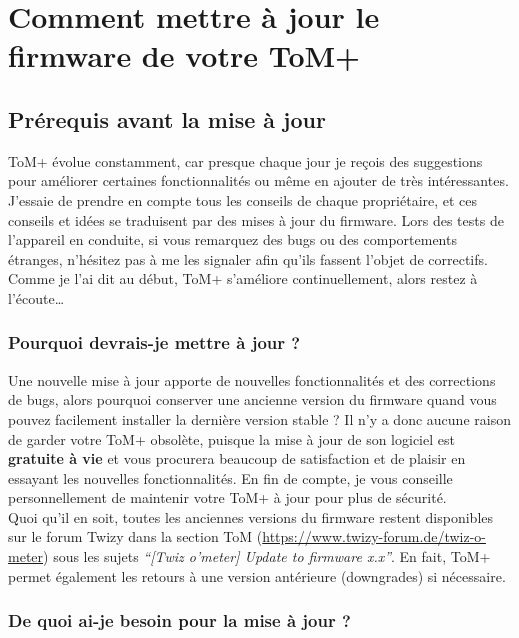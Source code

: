 \chapter{Comment mettre à jour le firmware de votre ToM+}
\label{sec:update_procedure}

\section{Prérequis avant la mise à jour}

ToM+ évolue constamment, car presque chaque jour je reçois des suggestions pour améliorer
certaines fonctionnalités ou même en ajouter de très intéressantes. J'essaie de prendre en compte tous les
conseils de chaque propriétaire, et ces conseils et idées se traduisent par des mises à jour du firmware.
Lors des tests de l'appareil en conduite, si vous remarquez des bugs ou des comportements étranges, n'hésitez pas à me les
signaler afin qu'ils fassent l'objet de correctifs. Comme je l'ai dit au début,
ToM+ s'améliore continuellement, alors restez à l'écoute\ldots

\subsection{Pourquoi devrais-je mettre à jour ?}

Une nouvelle mise à jour apporte de nouvelles fonctionnalités et des corrections de bugs, alors pourquoi conserver une ancienne
version du firmware quand vous pouvez facilement installer la dernière version stable ? Il n'y a donc aucune
raison de garder votre ToM+ obsolète, puisque la mise à jour de son logiciel est \textbf{gratuite à vie}
et vous procurera beaucoup de satisfaction et de plaisir en essayant les nouvelles fonctionnalités. En fin de compte, je vous conseille
personnellement de maintenir votre ToM+ à jour pour plus de sécurité.\\

Quoi qu'il en soit, toutes les anciennes versions du firmware restent disponibles sur le forum Twizy dans la section ToM
(\url{https://www.twizy-forum.de/twiz-o-meter}) sous les sujets \textit{“[Twiz o'meter] Update to
firmware x.x”}. En fait, ToM+ permet également les retours à une version antérieure (downgrades) si nécessaire.

\subsection{De quoi ai-je besoin pour la mise à jour ?}

